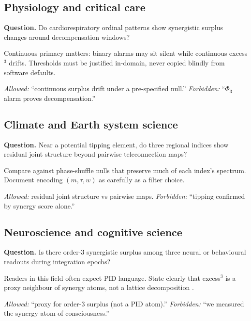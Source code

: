 \documentclass[11pt,a4paper]{article}
\begin{document}
\subsection{Physiology and critical care}

\begin{fieldbox}
\textbf{Question.} Do cardiorespiratory ordinal patterns show synergistic
surplus changes around decompensation windows?
\end{fieldbox}
Continuous primacy matters: binary alarms may sit silent while continuous
excess$^3$ drifts. Thresholds must be justified in-domain, never copied
blindly from software defaults.
\par\noindent\textit{Allowed:} ``continuous surplus drift under a pre-specified null.''
\textit{Forbidden:} ``$\Phi_3$ alarm proves decompensation.''

\subsection{Climate and Earth system science}

\begin{fieldbox}
\textbf{Question.} Near a potential tipping element, do three regional
indices show residual joint structure beyond pairwise teleconnection maps?
\end{fieldbox}
Compare against phase-shuffle nulls that preserve much of each index's
spectrum. Document encoding $(m,\tau,w)$ as carefully as a filter choice.
\par\noindent\textit{Allowed:} residual joint structure vs pairwise maps.
\textit{Forbidden:} ``tipping confirmed by synergy score alone.''

\subsection{Neuroscience and cognitive science}

\begin{fieldbox}
\textbf{Question.} Is there order-3 synergistic surplus among three neural
or behavioural readouts during integration epochs?
\end{fieldbox}
Readers in this field often expect PID language. State clearly that
excess$^3$ is a proxy neighbour of synergy atoms, not a lattice decomposition
\citep{Williams2010,Rosas2019}.
\par\noindent\textit{Allowed:} ``proxy for order-3 surplus (not a PID atom).''
\textit{Forbidden:} ``we measured the synergy atom of consciousness.''
\end{document}

